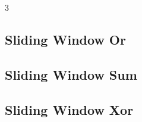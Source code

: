 \documentclass[8pt]{extarticle}
\begin{document}
\begin{multicols*}{3}
\subsection{Sliding Window Or}
\begin{caixaenunciado}

\end{caixaenunciado}
\vspace{0.3cm}


\subsection{Sliding Window Sum}
\begin{caixaenunciado}

\end{caixaenunciado}
\vspace{0.3cm}


\subsection{Sliding Window Xor}
\begin{caixaenunciado}

\end{caixaenunciado}
\vspace{0.3cm}

\end{multicols*}
\pagebreak
\end{document}
